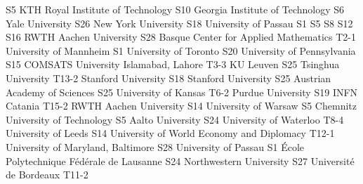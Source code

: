 \begin{multicols}{2}
{S5}
{}
{}
{}
{}
{}
{}
{KTH Royal Institute of Technology}
{S10}
{}
{}
{}
{}
{}
{}
{Georgia Institute of Technology}
{S6}
{}
{}
{}
{}
{}
{}
{Yale University}
{S26}
{}
{}
{}
{}
{}
{}
{New York University}
{S18}
{}
{}
{}
{}
{}
{}
{University of Passau}
{S1}
{S5}
{S8}
{S12}
{S16}
{}
{}
{RWTH Aachen University}
{S28}
{}
{}
{}
{}
{}
{}
{Basque Center for Applied Mathematics}
{T2-1}
{}
{}
{}
{}
{}
{}
{University of Mannheim}
{S1}
{}
{}
{}
{}
{}
{}
{University of Toronto}
{S20}
{}
{}
{}
{}
{}
{}
{University of Pennsylvania}
{S15}
{}
{}
{}
{}
{}
{}
{COMSATS University Islamabad, Lahore}
{T3-3}
{}
{}
{}
{}
{}
{}
{KU Leuven}
{S25}
{}
{}
{}
{}
{}
{}
{Tsinghua University}
{T13-2}
{}
{}
{}
{}
{}
{}
{Stanford University}
{S18}
{}
{}
{}
{}
{}
{}
{Stanford University}
{S25}
{}
{}
{}
{}
{}
{}
{Austrian Academy of Sciences}
{S25}
{}
{}
{}
{}
{}
{}
{University of Kansas}
{T6-2}
{}
{}
{}
{}
{}
{}
{Purdue University}
{S19}
{}
{}
{}
{}
{}
{}
{INFN Catania}
{T15-2}
{}
{}
{}
{}
{}
{}
{RWTH Aachen University}
{S14}
{}
{}
{}
{}
{}
{}
{University of Warsaw}
{S5}
{}
{}
{}
{}
{}
{}
{Chemnitz University of Technology}
{S5}
{}
{}
{}
{}
{}
{}
{Aalto University}
{S24}
{}
{}
{}
{}
{}
{}
{University of Waterloo}
{T8-4}
{}
{}
{}
{}
{}
{}
{University of Leeds}
{S14}
{}
{}
{}
{}
{}
{}
{University of World Economy and Diplomacy}
{T12-1}
{}
{}
{}
{}
{}
{}
{University of Maryland, Baltimore}
{S28}
{}
{}
{}
{}
{}
{}
{University of Passau}
{S1}
{}
{}
{}
{}
{}
{}
{\'Ecole Polytechnique F\'ed\'erale de Lausanne}
{S24}
{}
{}
{}
{}
{}
{}
{Northwestern University}
{S27}
{}
{}
{}
{}
{}
{}
{Universit\'e de Bordeaux}
{T11-2}
{}
{}
{}
{}

\end{multicols}
